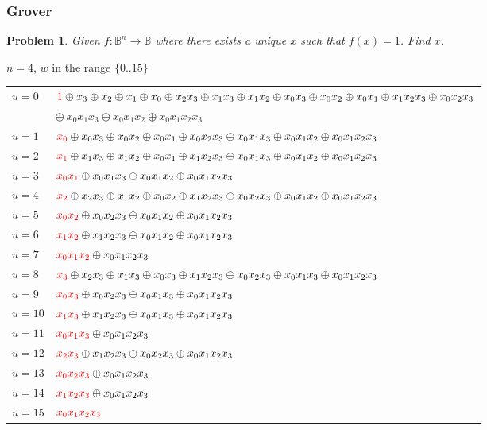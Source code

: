\documentclass{beamer}
\newcommand{\red}[1]{{\color{red}{#1}}}
\newcommand{\Bool}{\ensuremath{\mathbb{B}}}
\newtheorem{prob}{Problem}
\begin{document}
\begin{frame}

  \frametitle{Grover}

\begin{prob}
    Given $f : \Bool^n\rightarrow\Bool$ where there exists a unique $x$
    such that $f(x)=1$. Find $x$.
\end{prob}

\pause

$n=4$, $w$ in the range $\{0..15\}$
  {\tiny
\begin{tabular}{ll}
$u=0$ & 
  $\red{1} \oplus x_3 \oplus x_2 \oplus x_1 \oplus x_0 \oplus x_2x_3 \oplus x_1x_3 \oplus x_1x_2 \oplus x_0x_3 \oplus x_0x_2 \oplus x_0x_1 \oplus x_1x_2x_3 \oplus x_0x_2x_3$ \\
   &\quad $\oplus ~x_0x_1x_3 \oplus x_0x_1x_2 \oplus x_0x_1x_2x_3$ \\
$u=1$ & 
  $\red{x_0} \oplus x_0x_3 \oplus x_0x_2 \oplus x_0x_1 \oplus x_0x_2x_3 \oplus x_0x_1x_3 \oplus x_0x_1x_2 \oplus x_0x_1x_2x_3$ \\
$u=2$ &
  $\red{x_1} \oplus x_1x_3 \oplus x_1x_2 \oplus x_0x_1 \oplus x_1x_2x_3 \oplus x_0x_1x_3 \oplus x_0x_1x_2 \oplus x_0x_1x_2x_3$ \\
$u=3$ &
  $\red{x_0x_1} \oplus x_0x_1x_3 \oplus x_0x_1x_2 \oplus x_0x_1x_2x_3$ \\
$u=4$ &
  $\red{x_2} \oplus x_2x_3 \oplus x_1x_2 \oplus x_0x_2 \oplus x_1x_2x_3 \oplus x_0x_2x_3 \oplus x_0x_1x_2 \oplus x_0x_1x_2x_3$ \\
$u=5$ &
  $\red{x_0x_2} \oplus x_0x_2x_3 \oplus x_0x_1x_2 \oplus x_0x_1x_2x_3$ \\
$u=6$ &
  $\red{x_1x_2} \oplus x_1x_2x_3 \oplus x_0x_1x_2 \oplus x_0x_1x_2x_3$ \\
$u=7$ &
  $\red{x_0x_1x_2} \oplus x_0x_1x_2x_3$ \\
$u=8$ &
  $\red{x_3} \oplus x_2x_3 \oplus x_1x_3 \oplus x_0x_3 \oplus x_1x_2x_3 \oplus x_0x_2x_3 \oplus x_0x_1x_3 \oplus x_0x_1x_2x_3$ \\
$u=9$ &
  $\red{x_0x_3} \oplus x_0x_2x_3 \oplus x_0x_1x_3 \oplus x_0x_1x_2x_3$ \\
$u=10$ &
  $\red{x_1x_3} \oplus x_1x_2x_3 \oplus x_0x_1x_3 \oplus x_0x_1x_2x_3$ \\
$u=11$ &
  $\red{x_0x_1x_3} \oplus x_0x_1x_2x_3$ \\
$u=12$ &
  $\red{x_2x_3} \oplus x_1x_2x_3 \oplus x_0x_2x_3 \oplus x_0x_1x_2x_3$ \\
$u=13$ &
  $\red{x_0x_2x_3} \oplus x_0x_1x_2x_3$ \\
$u=14$ &
  $\red{x_1x_2x_3} \oplus x_0x_1x_2x_3$ \\
$u=15$ &
  $\red{x_0x_1x_2x_3}$
\end{tabular}
  }

\end{frame}
\end{document}
